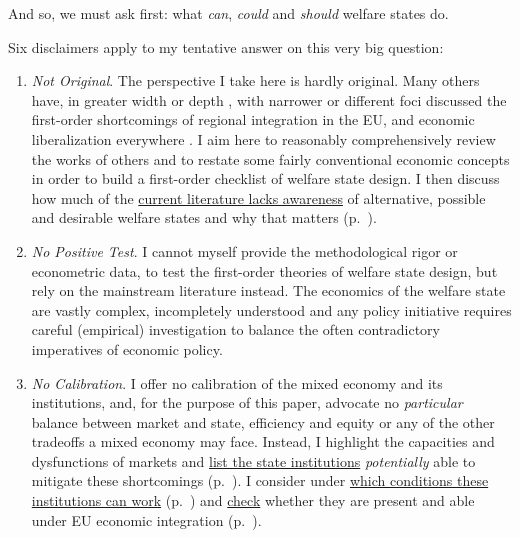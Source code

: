 \documentclass[11pt,a4paper,oneside]{article}
\begin{document}
And so, we must ask first: 
what \emph{can}, \emph{could} and \emph{should} welfare states do. 

Six disclaimers apply to my tentative answer on this very big question: \label{sec:disclaimers}

\begin{enumerate}
	\item \label{it:not-original} \emph{Not Original}. 
		The perspective I take here is hardly original. 
		Many others have, in greater width \citep{Stiglitz2002} or depth \citep{Sinn2004}, with narrower \citep{Scharpf1997} or different foci \citep{Zurn-2000-aa} discussed the first-order shortcomings of regional integration in the \gls{EU}, and economic liberalization everywhere \citep{Stiglitz2002}. 
		I aim here to reasonably comprehensively review the works of others and to restate some fairly conventional economic concepts in order to build a first-order checklist of welfare state design. 
		I then discuss how much of the \hyperref[sec:Literature]{current literature lacks awareness} of alternative, possible and desirable welfare states and why that matters (p.~\pageref{sec:Literature}).
	
	\item \label{it:no-test} \emph{No Positive Test}. 
		I cannot myself provide the methodological rigor or econometric data, to test the first-order theories of welfare state design, but rely on the mainstream literature instead. 
		The economics of the welfare state are vastly complex, incompletely understood and any policy initiative requires careful (empirical) investigation to balance the often contradictory imperatives of economic policy. 
	
	\item \label{it:no-calibration} \emph{No Calibration}. 
		I offer no calibration of the mixed economy and its institutions, and, for the purpose of this paper, advocate no \emph{particular} balance between market and state, efficiency and equity or any of the other tradeoffs a mixed economy may face. 
		Instead, I highlight the capacities and dysfunctions of markets and \hyperref[sec:ends]{list the state institutions} \emph{potentially} able to mitigate these shortcomings (p.~\pageref{sec:ends}). 
		I consider under \hyperref[sec:means]{which conditions these institutions can work} (p.~\pageref{sec:means}) and \hyperref[sec:defunct]{check} whether they are present and able under \gls{EU} economic integration (p.~\pageref{sec:defunct}).
	

\end{enumerate}
\end{document}
